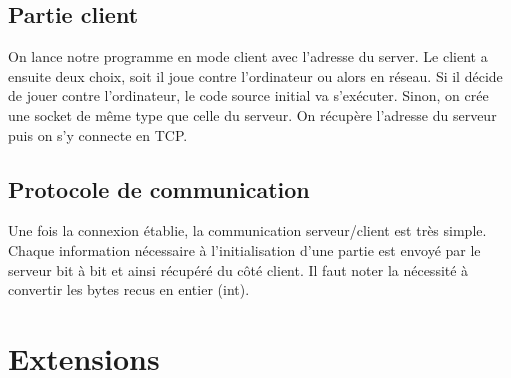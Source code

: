 \documentclass{article}
\begin{document}
	\subsection{Partie client}
	On lance notre programme en mode client avec l'adresse du server.
	Le client a ensuite deux choix, soit il joue contre l'ordinateur ou alors en r\'eseau.
	Si il d\'ecide de jouer contre l'ordinateur, le code source initial va s'ex\'ecuter.
	Sinon, on cr\'ee une socket de m\^eme type que celle du serveur.
	On r\'ecup\`ere l'adresse du serveur puis on s'y connecte en TCP.

	\subsection{Protocole de communication}
	Une fois la connexion \'etablie, la communication serveur/client est tr\`es simple.
	Chaque information n\'ecessaire \`a l'initialisation d'une partie est envoy\'e par le serveur bit \`a bit et ainsi r\'ecup\'er\'e du c\^ot\'e client.
	Il faut noter la n\'ecessit\'e \`a convertir les bytes recus en entier (int).

\section{Extensions}
\end{document}
